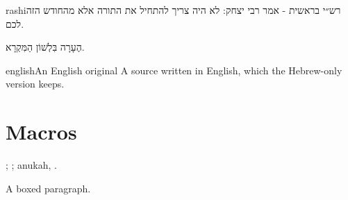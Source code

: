 \begin{mekor}
\begin{mekorlang}{rashi}{רש״י \sham}
בראשית - אמר רבי יצחק: לא היה צריך להתחיל את התורה אלא מהחודש הזה לכם.
\end{mekorlang}
\end{mekor}

\begin{hearah}[mikra]
הֶעָרָה בִּלְשׁוֹן הַמִּקְרָא.
\end{hearah}

\begin{mekor}
\begin{mekorlang}{english}{An English original}
A source written in English, which the Hebrew-only version keeps.
\end{mekorlang}
\end{mekor}


\section{Macros}

; ;
\Hdot anukah, .

\begin{boxedtext}
A boxed paragraph.
\end{boxedtext}


